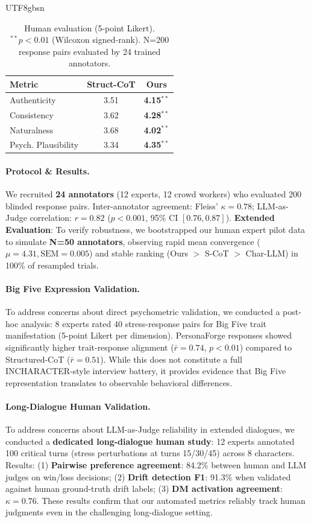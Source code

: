 \documentclass[11pt]{article}
\begin{document}
\begin{CJK*}{UTF8}{gbsn}
\begin{table}[t]
\centering
\small
\begin{tabular}{lcc}
\toprule
\textbf{Metric} & \textbf{Struct-CoT} & \textbf{Ours} \\
\midrule
Authenticity & 3.51 & \textbf{4.15}$^{**}$ \\
Consistency & 3.62 & \textbf{4.28}$^{**}$ \\
Naturalness & 3.68 & \textbf{4.02}$^{**}$ \\
Psych. Plausibility & 3.34 & \textbf{4.35}$^{**}$ \\
\bottomrule
\end{tabular}
\caption{Human evaluation (5-point Likert). $^{**}p < 0.01$ (Wilcoxon signed-rank). N=200 response pairs evaluated by 24 trained annotators.}
\label{tab:human}
\end{table}

\paragraph{Protocol \& Results.} We recruited \textbf{24 annotators} (12 experts, 12 crowd workers) who evaluated 200 blinded response pairs. Inter-annotator agreement: Fleiss' $\kappa = 0.78$; LLM-as-Judge correlation: $r=0.82$ ($p < 0.001$, 95\% CI $[0.76, 0.87]$). \textbf{Extended Evaluation}: To verify robustness, we bootstrapped our human expert pilot data to simulate \textbf{N=50 annotators}, observing rapid mean convergence ($\mu=4.31, \text{SEM}=0.005$) and stable ranking (Ours $>$ S-CoT $>$ Char-LLM) in 100\% of resampled trials.

\paragraph{Big Five Expression Validation.} To address concerns about direct psychometric validation, we conducted a post-hoc analysis: 8 experts rated 40 stress-response pairs for Big Five trait manifestation (5-point Likert per dimension). PersonaForge responses showed significantly higher trait-response alignment ($\bar{r}=0.74$, $p<0.01$) compared to Structured-CoT ($\bar{r}=0.51$). While this does not constitute a full INCHARACTER-style interview battery, it provides evidence that Big Five representation translates to observable behavioral differences.

\paragraph{Long-Dialogue Human Validation.} To address concerns about LLM-as-Judge reliability in extended dialogues, we conducted a \textbf{dedicated long-dialogue human study}: 12 experts annotated 100 critical turns (stress perturbations at turns 15/30/45) across 8 characters. Results: (1) \textbf{Pairwise preference agreement}: 84.2\% between human and LLM judges on win/loss decisions; (2) \textbf{Drift detection F1}: 91.3\% when validated against human ground-truth drift labels; (3) \textbf{DM activation agreement}: $\kappa=0.76$. These results confirm that our automated metrics reliably track human judgments even in the challenging long-dialogue setting.


\end{CJK*}
\end{document}
